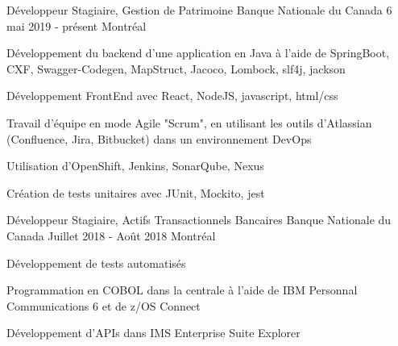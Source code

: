 \begin{cventries}
  \cventry
    {Développeur Stagiaire, Gestion de Patrimoine}
    {Banque Nationale du Canada}
    {6 mai 2019  - présent}
    {Montréal}
    {
      \begin{cvitems}
      \item{Développement du backend d'une application en Java à l'aide de SpringBoot, CXF, Swagger-Codegen, MapStruct, Jacoco, Lombock, slf4j, jackson}
      \item{Développement FrontEnd avec React, NodeJS, javascript, html/css}
      \item{Travail d'équipe en mode Agile "Scrum", en utilisant les outils d'Atlassian (Confluence, Jira, Bitbucket) dans un environnement DevOps}
      \item{Utilisation d'OpenShift, Jenkins, SonarQube, Nexus}
      \item{Création de tests unitaires avec JUnit, Mockito, jest}
      \end{cvitems}
    }
  \cventry
    {Développeur Stagiaire, Actifs Transactionnels Bancaires}
    {Banque Nationale du Canada}
    {Juillet 2018 - Août 2018}
    {Montréal}
    {
      \begin{cvitems}
      \item{Développement de tests automatisés}
        \item {Programmation en COBOL dans la centrale à l'aide de IBM Personnal Communications 6 et de z/OS Connect}
        \item {Développement d'APIs dans IMS Enterprise Suite Explorer}
      \end{cvitems}
    }
\end{cventries}
